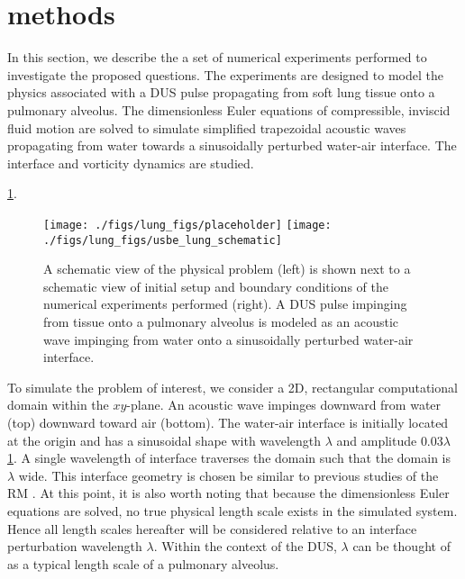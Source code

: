 \section{methods} \label{sec:usbe_lung_methods}%
In this section, we describe the a set of numerical experiments
performed to investigate the proposed questions. The experiments are
designed to model the physics associated with a \ac{DUS} pulse
propagating from soft lung tissue onto a pulmonary alveolus. The
dimensionless Euler equations of compressible, inviscid fluid motion
are solved to simulate simplified trapezoidal acoustic waves
propagating from water towards a sinusoidally perturbed water-air
interface. The interface and vorticity dynamics are studied.

\ref{fig:lung_schematic}.
\begin{figure}
  \centering
  \texttt{[image: ./figs/lung\_figs/placeholder]} \hfill
  \texttt{[image: ./figs/lung\_figs/usbe\_lung\_schematic]} \hfill
  \caption{A schematic view of the physical problem (left) is shown next
    to a schematic view of initial setup and boundary conditions of the
    numerical experiments performed (right). A \ac{DUS} pulse impinging
    from tissue onto a pulmonary alveolus is modeled as an acoustic wave
    impinging from water onto a sinusoidally perturbed water-air interface.}
  \label{fig:lung_schematic}
\end{figure}


To simulate the problem of interest, we consider a 2D, rectangular
computational domain within the $xy$-plane. An acoustic wave impinges
downward from water (top) downward toward air (bottom). The water-air
interface is initially located at the origin and has a sinusoidal
shape with wavelength $\lambda$ and amplitude $0.03\lambda$
\ref{fig:lung_schematic}. A single wavelength of interface traverses
the domain such that the domain is $\lambda$ wide. This interface
geometry is chosen be similar to previous studies of the \ac{RM}
\citep{Brouillette2002}. At this point, it is also worth noting that
because the dimensionless Euler equations are solved, no true physical
length scale exists in the simulated system. Hence all length scales
hereafter will be considered relative to an interface perturbation
wavelength $\lambda$. Within the context of the \ac{DUS}, $\lambda$
can be thought of as a typical length scale of a pulmonary alveolus.

